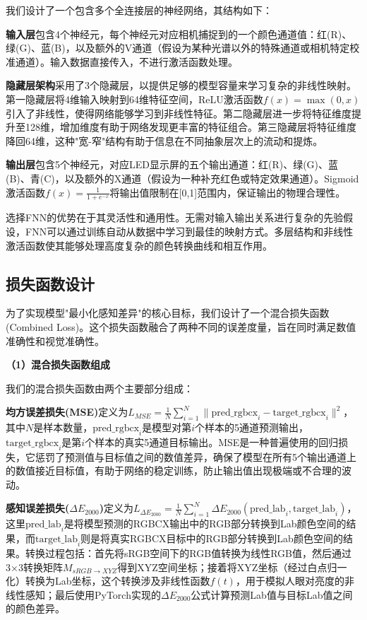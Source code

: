 我们设计了一个包含多个全连接层的神经网络，其结构如下：

\textbf{输入层}包含4个神经元，每个神经元对应相机捕捉到的一个颜色通道值：红(R)、绿(G)、蓝(B)，以及额外的V通道（假设为某种光谱以外的特殊通道或相机特定校准通道）。输入数据直接传入，不进行激活函数处理。

\textbf{隐藏层架构}采用了3个隐藏层，以提供足够的模型容量来学习复杂的非线性映射。第一隐藏层将4维输入映射到64维特征空间，ReLU激活函数$f(x) = \max(0, x)$引入了非线性，使得网络能够学习到非线性特征。第二隐藏层进一步将特征维度提升至128维，增加维度有助于网络发现更丰富的特征组合。第三隐藏层将特征维度降回64维，这种"宽-窄"结构有助于信息在不同抽象层次上的流动和提炼。

\textbf{输出层}包含5个神经元，对应LED显示屏的五个输出通道：红(R)、绿(G)、蓝(B)、青(C)，以及额外的X通道（假设为一种补充红色或特定效果通道）。Sigmoid激活函数$f(x) = \frac{1}{1+e^{-x}}$将输出值限制在[0,1]范围内，保证输出的物理合理性。

选择FNN的优势在于其灵活性和通用性。无需对输入输出关系进行复杂的先验假设，FNN可以通过训练自动从数据中学习到最佳的映射方式。多层结构和非线性激活函数使其能够处理高度复杂的颜色转换曲线和相互作用。

\subsection[\hspace{-2pt}损失函数设计]{{\heiti{} \hspace{-8pt}损失函数设计}}\label{section2: 损失函数设计}

为了实现模型"最小化感知差异"的核心目标，我们设计了一个混合损失函数 (Combined Loss)。这个损失函数融合了两种不同的误差度量，旨在同时满足数值准确性和视觉准确性。

\noindent\textbf{（1）混合损失函数组成}

我们的混合损失函数由两个主要部分组成：

\textbf{均方误差损失(MSE)}定义为$ L_{MSE} = \frac{1}{N} \sum_{i=1}^N \| \text{pred\_rgbcx}_i - \text{target\_rgbcx}_i \|^2 $，其中$N$是样本数量，$\text{pred\_rgbcx}_i$是模型对第$i$个样本的5通道预测输出，$\text{target\_rgbcx}_i$是第$i$个样本的真实5通道目标输出。MSE是一种普遍使用的回归损失，它惩罚了预测值与目标值之间的数值差异，确保了模型在所有5个输出通道上的数值接近目标值，有助于网络的稳定训练，防止输出值出现极端或不合理的波动。

\textbf{感知误差损失($\Delta E_{2000}$)}定义为$ L_{\Delta E_{2000}} = \frac{1}{N} \sum_{i=1}^N \Delta E_{2000}(\text{pred\_lab}_i, \text{target\_lab}_i) $，这里$\text{pred\_lab}_i$是将模型预测的RGBCX输出中的RGB部分转换到Lab颜色空间的结果，而$\text{target\_lab}_i$则是将真实RGBCX目标中的RGB部分转换到Lab颜色空间的结果。转换过程包括：首先将sRGB空间下的RGB值转换为线性RGB值，然后通过3×3转换矩阵$M_{sRGB \to XYZ}$得到XYZ空间坐标；接着将XYZ坐标（经过白点归一化）转换为Lab坐标，这个转换涉及非线性函数$f(t)$，用于模拟人眼对亮度的非线性感知；最后使用PyTorch实现的$\Delta E_{2000}$公式计算预测Lab值与目标Lab值之间的颜色差异。

